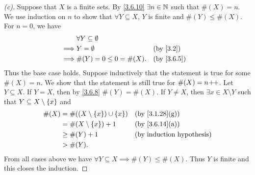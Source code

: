\begin{proof}[(c)]
	Suppose that \(X\) is a finite sets.
	By \cref{3.6.10} \(\exists n \in \mathbb{N}\) such that \(\#(X) = n\).
	We use induction on \(n\) to show that \(\forall Y \subseteq X\), \(Y\) is finite and \(\#(Y) \leq \#(X)\).
	For \(n = 0\), we have
	\begin{align*}
		         & \forall Y \subseteq \emptyset                 \\
		\implies & Y = \emptyset                 &  & \by{3.2}   \\
		\implies & \#(Y) = 0 \leq 0 = \#(X).     &  & \by{3.6.5}
	\end{align*}
	Thus the base case holds.
	Suppose inductively that the statement is true for some \(\#(X) = n\).
	We show that the statement is still true for \(\#(X) = n\!+\!\!+\).
	Let \(Y \subseteq X\).
	If \(Y = X\), then by \cref{3.6.8} \(\#(Y) = \#(X)\).
	If \(Y \neq X\), then \(\exists x \in X \setminus Y\) such that \(Y \subseteq X \setminus \left\lbrace x\right\rbrace\) and
	\begin{align*}
		\#(X) & = \#((X \setminus \set{x}) \cup \set{x}) &  & \text{(by \cref{3.1.28}(g))} \\
		      & = \#(X \setminus \set{x}) + 1            &  & \text{(by \cref{3.6.14}(a))} \\
		      & \geq \#(Y) + 1                           &  & \byIH                        \\
		      & > \#(Y).
	\end{align*}
	From all cases above we have \(\forall Y \subseteq X \implies \#(Y) \leq \#(X)\).
	Thus \(Y\) is finite and this closes the induction.


\end{proof}
